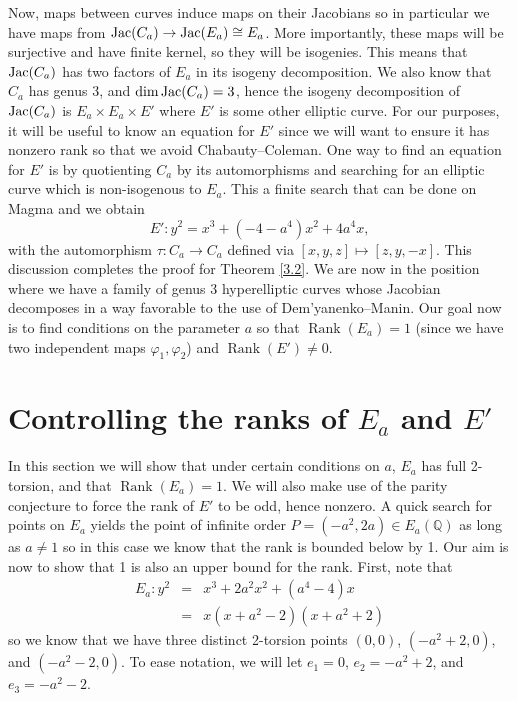 \documentclass{article}
\newcommand{\Q}{\mathbb{Q}}
\theoremstyle{definition}
\newcommand{\Jac}{\textnormal{Jac}}
\DeclareMathOperator{\Rank}{Rank}
\begin{document}
\noindent Now, maps between curves induce maps on their Jacobians so in particular we have maps from $\Jac(C_a) \to \Jac(E_a) \cong E_a$. More importantly, these maps will be surjective and have finite kernel, so they will be isogenies. This means that $\Jac(C_a)$ has two factors of $E_a$ in its isogeny decomposition. We also know that $C_a$ has genus 3, and $\dim \Jac(C_a) = 3$, hence the isogeny decomposition of $\Jac(C_a)$ is $E_a \times E_a \times E'$ where $E'$ is some other elliptic curve. For our purposes, it will be useful to know an equation for $E'$ since we will want to ensure it has nonzero rank so that we avoid Chabauty--Coleman. One way to find an equation for $E'$ is by quotienting $C_a$ by  its automorphisms and searching for an elliptic curve which is non-isogenous to $E_a$. This a finite search that can be done on Magma and we obtain 
\begin{equation*}
    E' \colon y^2 = x^3 + (-4-a^4)x^2 + 4a^4 x,
\end{equation*}
with the automorphism $\tau: C_a \to C_a$ defined via $[x,y,z] \mapsto [z,y,-x]$.
\noindent This discussion completes the proof for Theorem \ref{3.2}. We are now in the position where we have a family of genus 3 hyperelliptic curves whose Jacobian decomposes in a way favorable to the use of Dem'yanenko--Manin.
\noindent Our goal now is to find conditions on the parameter $a$ so that $\Rank(E_a) = 1$ (since we have two independent maps $\varphi_1, \varphi_2$) and $\Rank(E') \neq 0$.

\section{Controlling the ranks of $E_a$ and $E'$}
In this section we will show that under certain conditions on $a$, $E_a$ has full 2-torsion, and that $\Rank(E_a) = 1$. We will also make use of the parity conjecture to force the rank of $E'$ to be odd, hence nonzero. A quick search for points on $E_a$ yields the point of infinite order $P = (-a^2,2a) \in E_a(\Q)$ as long as $a \neq 1$ so in this case we know that the rank is bounded below by 1. Our aim is now to show that 1 is also an upper bound for the rank. First, note that 
\begin{eqnarray*}
    E_a \colon y^2 &=& x^3 + 2a^2x^2 + (a^4-4)x \\
    &=& x(x+a^2-2)(x+a^2+2)
\end{eqnarray*} 
so we know that we have three distinct 2-torsion points $(0,0)$, $(-a^2+2,0)$, and $(-a^2-2,0)$. To ease notation, we will let $e_1 = 0$, $e_2 = -a^2 + 2$, and $e_3 = -a^2 - 2$. 
\end{document}
